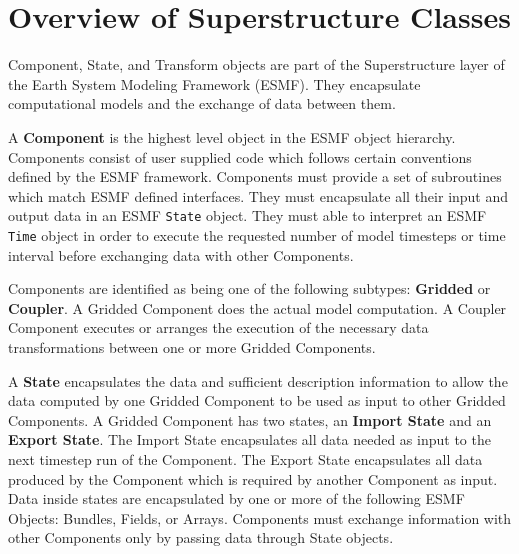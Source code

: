 %

\section{Overview of Superstructure Classes}

Component, State, and Transform objects are part of the Superstructure 
layer of the Earth System Modeling Framework (ESMF).  They encapsulate
computational models and the exchange of data between them.

A {\bf Component} 
is the highest level object in the ESMF object
hierarchy.  Components consist of user supplied code
which follows certain conventions defined by the ESMF framework. 
Components must provide a set of subroutines which match ESMF
defined interfaces. They must encapsulate
all their input and output data in an ESMF {\tt State} object.  They
must able to interpret an ESMF {\tt Time} object in order
to execute the requested number of model timesteps or time interval
before exchanging data with other Components.

Components are identified as being one of the
following subtypes: {\bf Gridded} or {\bf Coupler}.  
A Gridded Component does the actual model computation.  
A Coupler Component executes or arranges the execution of the 
necessary data transformations between one or more Gridded Components.

A {\bf State} 
encapsulates the data and sufficient description information
to allow the data computed by one Gridded Component to be
used as input to other Gridded Components.  A Gridded Component has
two states, an {\bf Import State} and an {\bf Export State}.
The Import State encapsulates all data needed as input to the
next timestep run of the Component.  The Export State encapsulates 
all data produced by the Component which is required by another
Component as input.  Data inside states are encapsulated by one 
or more of the following ESMF Objects: Bundles, Fields, or Arrays.
Components must exchange information with other Components
only by passing data through State objects.

